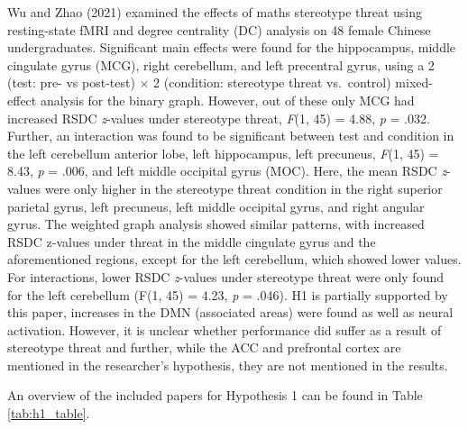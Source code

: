 \documentclass[
  stu, a4paper,floatsintext]{apa7}
\begin{document}
Wu and Zhao (2021) examined the effects of maths stereotype threat using resting-state fMRI and degree centrality (DC) analysis on 48 female Chinese undergraduates.
Significant main effects were found for the hippocampus, middle cingulate gyrus (MCG), right cerebellum, and left precentral gyrus, using a 2 (test: pre- vs post-test) \(\times\) 2 (condition: stereotype threat vs.~control) mixed-effect analysis for the binary graph.
However, out of these only MCG had increased RSDC \emph{z}-values under stereotype threat, \emph{F}(1, 45) = 4.88, \emph{p} = .032.
Further, an interaction was found to be significant between test and condition in the left cerebellum anterior lobe, left hippocampus, left precuneus, \emph{F}(1, 45) = 8.43, \emph{p} = .006, and left middle occipital gyrus (MOC).
Here, the mean RSDC \emph{z}-values were only higher in the stereotype threat condition in the right superior parietal gyrus, left precuneus, left middle occipital gyrus, and right angular gyrus.
The weighted graph analysis showed similar patterns, with increased RSDC z-values under threat in the middle cingulate gyrus and the aforementioned regions, except for the left cerebellum, which showed lower values.
For interactions, lower RSDC \emph{z}-values under stereotype threat were only found for the left cerebellum (F(1, 45) = 4.23, \emph{p} = .046).
H1 is partially supported by this paper, increases in the DMN (associated areas) were found as well as neural activation. However, it is unclear whether performance did suffer as a result of stereotype threat and further, while the ACC and prefrontal cortex are mentioned in the researcher's hypothesis, they are not mentioned in the results.

An overview of the included papers for Hypothesis 1 can be found in Table \ref{tab:h1_table}.
\end{document}
